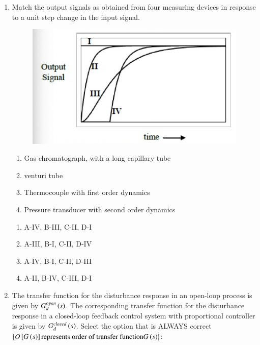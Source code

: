 \documentclass[journal,12pt,onecolumn]{IEEEtran}
\theoremstyle{remark}
\begin{document}
\begin{enumerate}
\hfill{}
\begin{enumerate}
    \item 0
    \item 1
    \item 1.5
    \item 2
\end{enumerate}

    \item Match the output signals as obtained from four measuring devices in response to a unit step change in the input signal.

\hfill{}
    \begin{multicols}{2}
        \begin{figure}[H]
            \centering
            \includegraphics[width=0.7\columnwidth]{figs/30.png}
            \caption{}
            \label{fig:30}
        \end{figure}
\columnbreak
    \begin{enumerate}[label = \Alph*]
        \item Gas chromatograph, with a long capillary tube
        \item venturi tube
        \item Thermocouple with first order dynamics
        \item Pressure transducer with second order dynamics
    \end{enumerate}
    \end{multicols}

\begin{enumerate}
    \item A-IV, B-III, C-II, D-I 
     \item A-III, B-I, C-II, D-IV
      \item A-IV, B-I, C-II, D-III 
       \item A-II, B-IV, C-III, D-I 
\end{enumerate}

    \item The transfer function for the disturbance response in an open-loop process is given by $G_d^{open}\left(s\right)$. The corresponding transfer function for the disturbance response in a closed-loop feedback control system with proportional controller is given by $G_d^{closed}\left(s\right)$. Select the option that is ALWAYS correct $\left\{O{}\left[G\left(s\right)\right] \text{represents order of transfer function} G\left(s\right)\right\}$:


\end{enumerate}
\end{document}
